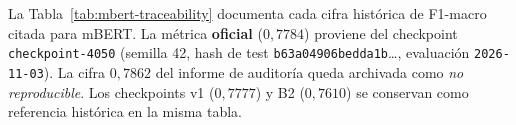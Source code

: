 La Tabla~\ref{tab:mbert-traceability} documenta cada cifra histórica de F1-macro citada para mBERT. La métrica \textbf{oficial} ($0{,}7784$) proviene del checkpoint \texttt{checkpoint-4050} (semilla 42, hash de test \texttt{b63a04906bedda1b}\ldots, evaluación \texttt{2026-11-03}). La cifra $0{,}7862$ del informe de auditoría queda archivada como \emph{no reproducible}. Los checkpoints v1 ($0{,}7777$) y B2 ($0{,}7610$) se conservan como referencia histórica en la misma tabla.
